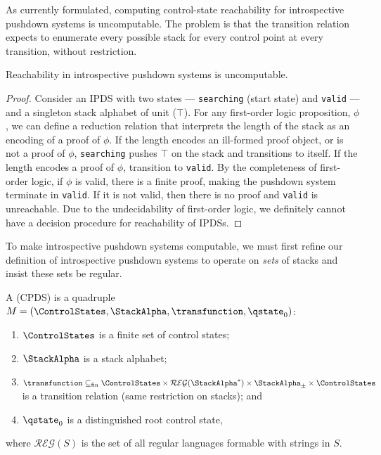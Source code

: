 As currently formulated, computing control-state reachability
for introspective pushdown systems is uncomputable.
The problem is that the transition relation expects to enumerate every possible
stack for every control point at every transition, without restriction.
\begin{theorem}
  Reachability in introspective pushdown systems is uncomputable.
\end{theorem}
\begin{proof}
  Consider an IPDS with two states --- {\tt searching} (start state) and
  {\tt valid} --- and a singleton stack alphabet of unit
  ($\top$).
For any first-order logic proposition, $\phi$, we can define a
  reduction relation that interprets the length of the stack as an
  encoding of a proof of $\phi$.
If the length encodes an ill-formed proof object, or is not a proof
  of $\phi$, {\tt searching} pushes $\top$ on the stack
  and transitions to itself.
If the length encodes a proof of $\phi$, transition
  to {\tt valid}.
By the completeness of first-order logic, if $\phi$ is valid, there
  is a finite proof, making the pushdown system terminate in {\tt valid}.
  If it is not valid, then there is no proof and {\tt valid} is unreachable.
  Due to the undecidability of first-order logic, we definitely cannot have a decision procedure for
  reachability of IPDSs.
\end{proof}


To make introspective pushdown systems computable,
we must first refine our definition of introspective pushdown
systems to operate on \emph{sets} of stacks
and insist these sets be regular.

\newpage

A  (CPDS) is a quadruple
$M = (\ControlStates,\StackAlpha,\transfunction,\qstate_0)$:
\begin{enumerate}

\item $\ControlStates$ is a finite set of control states;

\item $\StackAlpha$ is a stack alphabet; 

\item $\transfunction \subseteq_\text{fin} \ControlStates \times \mathcal{REG}(\StackAlpha^*)
\times \StackAlpha_\pm \times \ControlStates$ is a transition relation (same restriction on stacks); and

\item $\qstate_0$ is a distinguished root control state,
\end{enumerate}
where $\mathcal{REG}(S)$ is the set of all regular languages formable with strings in $S$.

